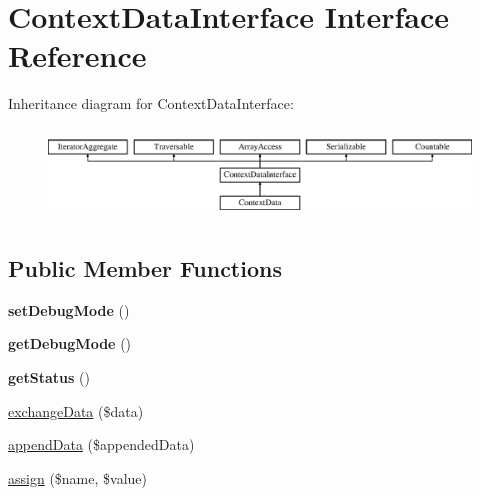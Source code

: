 \hypertarget{interface_pes_1_1_type_1_1_context_data_interface}{}\section{Context\+Data\+Interface Interface Reference}
\label{interface_pes_1_1_type_1_1_context_data_interface}
Inheritance diagram for Context\+Data\+Interface\+:\begin{figure}[H]
\begin{center}
\leavevmode
\includegraphics[height=2.434783cm]{interface_pes_1_1_type_1_1_context_data_interface}
\end{center}
\end{figure}
\subsection*{Public Member Functions}
\begin{DoxyCompactItemize}
\item 
\mbox{\label{interface_pes_1_1_type_1_1_context_data_interface_a597060355e49b541435c5f07a7646e3f}} 
{\bfseries set\+Debug\+Mode} ()
\item 
\mbox{\label{interface_pes_1_1_type_1_1_context_data_interface_aef403af504f818f9acbff3caaa01cf69}} 
{\bfseries get\+Debug\+Mode} ()
\item 
\mbox{\label{interface_pes_1_1_type_1_1_context_data_interface_a9d21636071f529e2154051d3ea6e5921}} 
{\bfseries get\+Status} ()
\item 
\mbox{\hyperlink{interface_pes_1_1_type_1_1_context_data_interface_abdec3ea9fb5d4719d665c630123e59fc}{exchange\+Data}} (\$data)
\item 
\mbox{\hyperlink{interface_pes_1_1_type_1_1_context_data_interface_a9ca70df7ea476fc99e323dd024495ddc}{append\+Data}} (\$appended\+Data)
\item 
\mbox{\hyperlink{interface_pes_1_1_type_1_1_context_data_interface_ac151b5fc880911b525ed71fd25806f62}{assign}} (\$name, \$value)
\end{DoxyCompactItemize}


